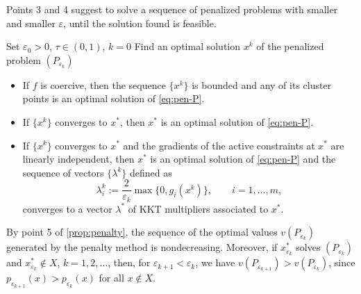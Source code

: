 Points 3 and 4 suggest to solve a sequence of penalized problems with smaller and smaller $\varepsilon$, until the solution found is feasible.

\begin{algorithm}[htbp]
\caption{Penalty method}
Set $\varepsilon_0 > 0$, $\tau \in (0,1)$, $k = 0$\;
Find an optimal solution $x^k$ of the penalized problem $(P_{\varepsilon_k})$\;
\end{algorithm}

\begin{theorem}[Convergence]
\leavevmode
\begin{itemize}
    \item If $f$ is coercive, then the sequence $\{x^k\}$ is bounded and any of its cluster points is an optimal solution of \eqref{eq:pen-P}.
    \item If $\{x^k\}$ converges to $x^*$, then $x^*$ is an optimal solution of \eqref{eq:pen-P}.
    \item If $\{x^k\}$ converges to $x^*$ and the gradients of the active constraints at $x^*$ are linearly independent, then $x^*$ is an optimal solution of \eqref{eq:pen-P} and the sequence of vectors $\{\lambda^k\}$ defined as
    \[
    \lambda_i^k := \frac{2}{\varepsilon_k} \max\{0, g_i(x^k)\}, \qquad i=1,\dots,m,
    \]
    converges to a vector $\lambda^*$ of KKT multipliers associated to $x^*$.
\end{itemize}
\end{theorem}

\begin{remark}
By point 5 of \cref{prop:penalty}, the sequence of the optimal values $v(P_{\varepsilon_k})$ generated by the penalty method is nondecreasing. Moreover, if $x_{\varepsilon_k}^*$ solves $(P_{\varepsilon_k})$ and $x_{\varepsilon_k}^* \notin X$, $k = 1,2,\dots$, then, for $\varepsilon_{k+1} < \varepsilon_k$, we have $v(P_{\varepsilon_{k+1}}) > v(P_{\varepsilon_k})$, since $p_{\varepsilon_{k+1}}(x) > p_{\varepsilon_k}(x)$ for all $x \notin X$.
\end{remark}
